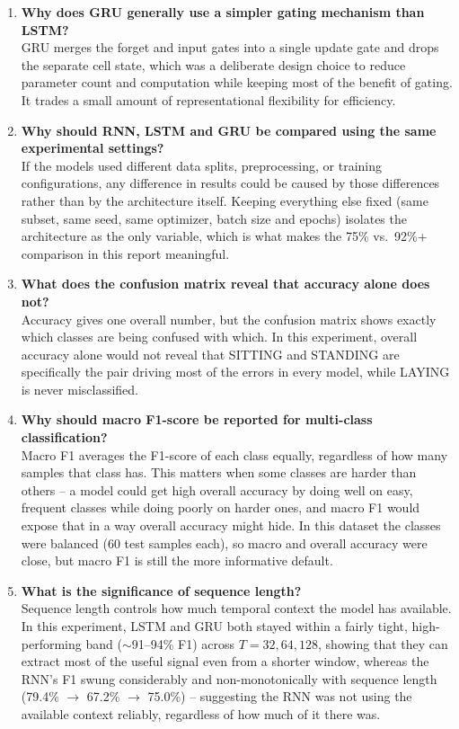 \documentclass[10pt]{article}
\begin{document}
\begin{enumerate}
\item \textbf{Why does GRU generally use a simpler gating mechanism than LSTM?}\\
GRU merges the forget and input gates into a single update gate and drops
the separate cell state, which was a deliberate design choice to reduce
parameter count and computation while keeping most of the benefit of
gating. It trades a small amount of representational flexibility for
efficiency.

\item \textbf{Why should RNN, LSTM and GRU be compared using the same experimental settings?}\\
If the models used different data splits, preprocessing, or training
configurations, any difference in results could be caused by those
differences rather than by the architecture itself. Keeping everything
else fixed (same subset, same seed, same optimizer, batch size and epochs)
isolates the architecture as the only variable, which is what makes the
75\% vs.\ 92\%+ comparison in this report meaningful.

\item \textbf{What does the confusion matrix reveal that accuracy alone does not?}\\
Accuracy gives one overall number, but the confusion matrix shows exactly
which classes are being confused with which. In this experiment, overall
accuracy alone would not reveal that SITTING and STANDING are specifically
the pair driving most of the errors in every model, while LAYING is never
misclassified.

\item \textbf{Why should macro F1-score be reported for multi-class classification?}\\
Macro F1 averages the F1-score of each class equally, regardless of how
many samples that class has. This matters when some classes are harder
than others -- a model could get high overall accuracy by doing well on
easy, frequent classes while doing poorly on harder ones, and macro F1
would expose that in a way overall accuracy might hide. In this dataset the
classes were balanced (60 test samples each), so macro and overall accuracy
were close, but macro F1 is still the more informative default.

\item \textbf{What is the significance of sequence length?}\\
Sequence length controls how much temporal context the model has available.
In this experiment, LSTM and GRU both stayed within a fairly tight,
high-performing band ($\sim$91--94\% F1) across $T=32,64,128$, showing that
they can extract most of the useful signal even from a shorter window,
whereas the RNN's F1 swung considerably and non-monotonically with sequence
length (79.4\% $\to$ 67.2\% $\to$ 75.0\%) -- suggesting the RNN was not
using the available context reliably, regardless of how much of it there
was.


\end{enumerate}
\end{document}
